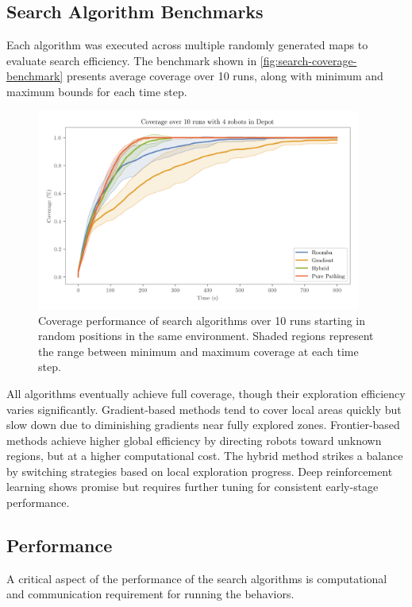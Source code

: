 \subsection{Search Algorithm Benchmarks}
Each algorithm was executed across multiple randomly generated maps to evaluate search efficiency. The benchmark shown in \cref{fig:search-coverage-benchmark} presents average coverage over 10 runs, along with minimum and maximum bounds for each time step.

\begin{figure}[H]
    \begin{center}
        \includegraphics[width=0.95\textwidth]{./figures/plots/benchmarks/coverage-over-10-runs-with-4-robots-in-depot.png}
    \end{center}
    \caption{Coverage performance of search algorithms over 10 runs starting in random positions in the same environment. Shaded regions represent the range between minimum and maximum coverage at each time step.}
    \label{fig:coverage-benchmark}
\end{figure}

All algorithms eventually achieve full coverage, though their exploration efficiency varies significantly. 
Gradient-based methods tend to cover local areas quickly but slow down due to diminishing gradients near fully explored zones. 
Frontier-based methods achieve higher global efficiency by directing robots toward unknown regions, but at a higher computational cost. The hybrid method strikes a balance by switching strategies based on local exploration progress. 
Deep reinforcement learning shows promise but requires further tuning for consistent early-stage performance.

\subsection{Performance}
A critical aspect of the performance of the search algorithms is computational and communication requirement for running the behaviors. 
